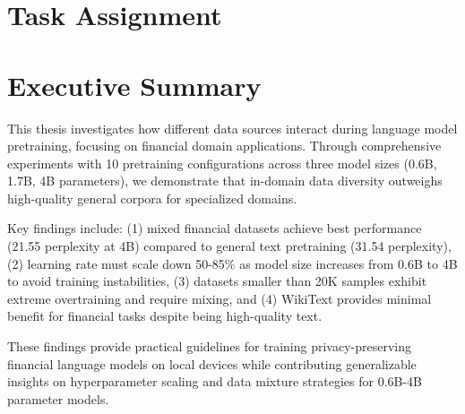 \documentclass[11pt,a4paper,english,oneside]{book}
\begin{document}
\thispagestyle{empty}
\titleGP

\newpage

\doublespacing
\setcounter{page}{1}

\section*{Task Assignment}
\thispagestyle{firststyle}
\newpage

\section*{Executive Summary}
\thispagestyle{firststyle}

This thesis investigates how different data sources interact during language model pretraining, focusing on financial domain applications. Through comprehensive experiments with 10 pretraining configurations across three model sizes (0.6B, 1.7B, 4B parameters), we demonstrate that in-domain data diversity outweighs high-quality general corpora for specialized domains.

Key findings include: (1) mixed financial datasets achieve best performance (21.55 perplexity at 4B) compared to general text pretraining (31.54 perplexity), (2) learning rate must scale down 50-85\% as model size increases from 0.6B to 4B to avoid training instabilities, (3) datasets smaller than 20K samples exhibit extreme overtraining and require mixing, and (4) WikiText provides minimal benefit for financial tasks despite being high-quality text.

These findings provide practical guidelines for training privacy-preserving financial language models on local devices while contributing generalizable insights on hyperparameter scaling and data mixture strategies for 0.6B-4B parameter models.

\newpage

\tableofcontents
\listoffigures
\listoftables
\end{document}
